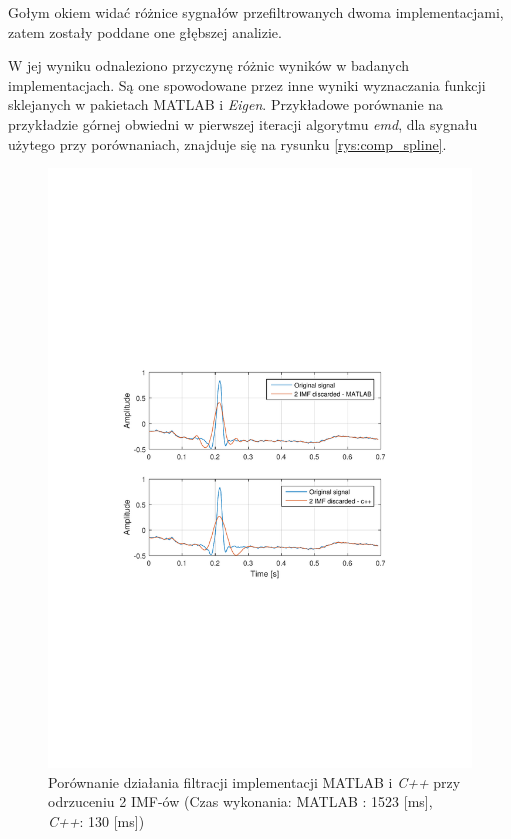 Gołym okiem widać różnice sygnałów przefiltrowanych dwoma implementacjami, zatem
zostały poddane one głębszej analizie.

W jej wyniku odnaleziono przyczynę różnic
wyników w badanych implementacjach. Są one spowodowane przez inne wyniki
wyznaczania funkcji sklejanych w pakietach \textrm{MATLAB} i \textit{Eigen}.
Przykładowe porównanie na przykładzie górnej obwiedni w pierwszej iteracji
algorytmu \textit{emd}, dla sygnału użytego przy porównaniach, znajduje się na
rysunku \ref{rys:comp_spline}.

\newpage

\begin{figure}[!htb]
    \begin{center}
        \includegraphics[width=13cm,trim=3cm 9.2cm 4cm 10cm,clip]
        {../img/mat_cpp_domp_d2.pdf}
    \end{center}
    \caption{Porównanie działania filtracji implementacji \textrm{MATLAB} i
    \textit{C++} przy odrzuceniu 2 IMF-ów (Czas wykonania: \textrm{MATLAB} :
    1523 [ms], \textit{C++}: 130 [ms])}
    \label{rys:comp_d2}
\end{figure}

